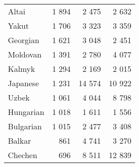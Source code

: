 \begin{table}[!h]
\begin{tabular}{lrrr}
Altai & 1 894 & 2 475 & 2 632\\
Yakut & 1 706 & 3 323 & 3 359\\
Georgian & 1 621 & 3 048 & 2 451\\
Moldovan & 1 391 & 2 780 & 4 077\\
Kalmyk & 1 294 & 2 169 & 2 015\\
Japanese & 1 231 & 14 574 & 10 922\\
Uzbek & 1 061 & 4 044 & 8 798\\
Hungarian & 1 018 & 1 611 & 1 556\\
Bulgarian & 1 015 & 2 477 & 3 408\\
Balkar & 861 & 4 741 & 3 270\\
Chechen & 696 & 8 511 & 12 839\\
\bottomrule
\end{tabular}
\end{table}